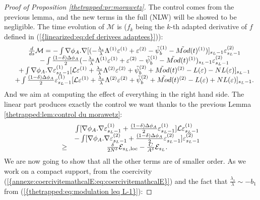 \documentclass[11pt,a4paper,reqno]{amsart}
\theoremstyle{remark}
\numberwithin{equation}{section}
\begin{document}
\begin{proof}[Proof of Proposition \ref{thetrapped:pr:morawetz}]
The control comes from the previous lemma, and the new terms in the full (NLW) will be showed to be negligible. The time evolution of $\mathcal{M}$ is ($f_k$ being the $k$-th adapted derivative of $f$ defined in {{\rm (\ref{{linearized:eq:def derivees adaptees}})}}):
\begin{equation} \label{thetrapped:morawetz:eq:expression dtM}
\begin{array}{r c l}
&\frac{d}{ds}\mathcal{M}= -\int \nabla \phi_A .\nabla [ (-\frac{\lambda_s}{\lambda}\Lambda^{(1)}\varepsilon^{(1)}+\varepsilon^{(2)}-\tilde{\psi}_b^{(1)}-\tilde{Mod}(t)^{(1)})]_{s_L-1}\varepsilon^{(2)}_{s_L-1} \\
&- \int \frac{(1-\delta)\Delta \phi_A}{2}(-\frac{\lambda_s}{\lambda}\Lambda^{(1)}\varepsilon^{(1)}+\varepsilon^{(2)}-\tilde{\psi}_b^{(1)}-\tilde{Mod}(t)^{(1)})_{s_L-1} \varepsilon^{(2)}_{s_L-1} \\
&+\int \nabla \phi_A .\nabla \varepsilon^{(1)}_{s_L-1}[\mathcal{L}\varepsilon^{(1)}+\frac{\lambda_s}{\lambda}\Lambda^{(2)}\varepsilon^{(2)}+\tilde{\psi}_b^{(2)}+\tilde{Mod}(t)^{(2)}-L(\varepsilon)-NL(\varepsilon)]_{s_L-1} \\
&+ \int \frac{(1-\delta)\Delta \phi_A}{2}\varepsilon^{(1)}_{s_L-1} [\mathcal{L}\varepsilon^{(1)}+\frac{\lambda_s}{\lambda}\Lambda^{(2)}\varepsilon^{(2)}+\tilde{\psi}_b^{(2)}+\tilde{Mod}(t)^{(2)}-L(\varepsilon)+NL(\varepsilon)]_{s_L-1} .
\end{array}
\end{equation}
And we aim at computing the effect of everything in the right hand side. The linear part produces exactly the control we want thanks to the previous Lemma \ref{thetrapped:lem:control du morawetz}:
\begin{equation} \label{thetrapped:morawetz:eq:estimation lineaire}
\begin{array}{r c l}
& \int [\nabla \phi_A .\nabla \varepsilon^{(1)}_{s_L-1}+\frac{(1-\delta)\Delta \phi_A}{2}\varepsilon^{(1)}_{s_L-1}] \mathcal{L}\varepsilon^{(1)}_{s_L-1} \\
&-\int [\nabla \phi_A .\nabla \varepsilon^{(2)}_{s_L-1}+\frac{(1-\delta)\Delta \phi_A}{2}\varepsilon^{(2)}_{s_L-1}] \varepsilon^{(2)}_{s_L-1}\\
\geq &\frac{\delta}{2N^{\delta}} \mathcal{E}_{s_L,\text{loc}} -\frac{C}{A^{\delta}}\mathcal{E}_{s_L} .
\end{array}
\end{equation}
We are now going to show that all the other terms are of smaller order. As we work on a compact support, from the coercivity {{\rm (\ref{{annexe:coercivitemathcalE:eq:coercivitemathcalE}})}} and the fact that $\frac{\lambda_s}{\lambda}\sim -b_1$ from {{\rm (\ref{{thetrapped:eq:modulation leq L-1}})}}:

\end{proof}
\end{document}
